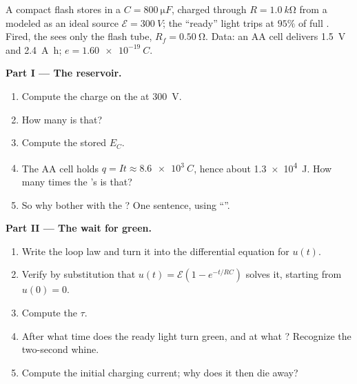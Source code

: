 \begin{problem}
\label{pb:g12:rc-rl-circuits:1}
A compact flash  stores  in a 
$C = \qty{800}{\micro F}$, charged through $R = \qty{1.0}{k\ohm}$ from
a  modeled as an ideal source $\mathcal{E} = \qty{300}{V}$;
the ``ready'' light trips at $95\%$ of full . Fired, the
 sees only the flash tube, $R_f = \qty{0.50}{\ohm}$. Data: an
AA cell delivers \qty{1.5}{V} and \qty{2.4}{A.h}; $e = \qty{1.60e-19}{C}$.

\medskip
\noindent\textbf{Part I --- The reservoir.}
\begin{enumerate}
  \item Compute the charge on the  at \qty{300}{V}.
  \item How many  is that?
  \item Compute the stored  $E_C$.
  \item The AA cell holds $q = It \approx \qty{8.6e3}{C}$, hence about
        \qty{1.3e4}{J}. How many times the 's  is that?
  \item So why bother with the ? One sentence, using ``''.
\end{enumerate}

\medskip
\noindent\textbf{Part II --- The wait for green.}
\begin{enumerate}[resume]
  \item Write the loop law and turn it into the differential equation
        for $u(t)$.
  \item Verify by substitution that $u(t) = \mathcal{E}(1 - e^{-t/RC})$
        solves it, starting from $u(0) = 0$.
  \item Compute the  $\tau$.
  \item After what time does the ready light turn green, and at what
        ? Recognize the two-second whine.
  \item Compute the initial charging current; why does it then die
        away?
\end{enumerate}


\end{problem}
